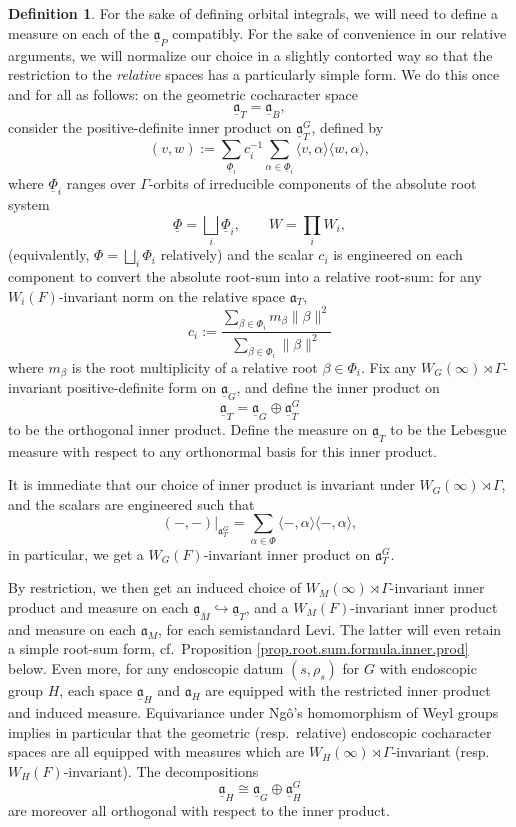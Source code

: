 \documentclass[openany]{amsbook}
\theoremstyle{definition}
\newtheorem{definition}[theorem]{Definition}
\theoremstyle{remark}
\numberwithin{equation}{section}
\newcommand{\ul}[1]{\underline{#1}}
\renewcommand{\-}{\operatorname{-}}
\renewcommand{\a}{\mathfrak{a}}
\newcommand{\ga}{\ul{\a}}
\begin{document}
\begin{definition}\label{def.cochar.space.measure.choice}
    For the sake of defining orbital integrals, we will need to define a measure on each of the $\ga_P$ compatibly. For the sake of convenience in our relative arguments, we will normalize our choice in a slightly contorted way so that the restriction to the \emph{relative} spaces has a particularly simple form. We do this once and for all as follows: on the geometric cocharacter space
    $$\ga_T = \ga_B,$$
    consider the positive-definite inner product on $\ga_T^G$, defined by
    $$
        (v, w) := \sum_{\ul{\Phi}_i} c_{i}^{-1} \sum_{\alpha \in \ul{\Phi}_i} \langle v, \alpha \rangle \langle w, \alpha \rangle,
    $$
    where $\ul{\Phi}_i$ ranges over $\Gamma$-orbits of irreducible components of the absolute root system
    $$
        \ul{\Phi} = \bigsqcup_i \ul{\Phi}_i, \qquad W = \prod_i W_i,
    $$
    (equivalently, $\Phi = \bigsqcup_i \Phi_i$ relatively) and the scalar $c_i$ is engineered on each component to convert the absolute root-sum into a relative root-sum: for any $W_i(F)$-invariant norm on the relative space $\a_T$,
    $$
        c_i := \frac{\sum_{\beta \in \Phi_i} m_\beta\| \beta\|^2}{\sum_{\beta \in \Phi_i}\| \beta\|^2}
    $$
    where $m_\beta$ is the root multiplicity of a relative root $\beta \in \Phi_i$. Fix any $W_G(\infty) \rtimes \Gamma$-invariant positive-definite form on $\ga_G$, and define the inner product on 
    $$
        \ga_T = \ga_G \oplus \ga_T^G
    $$
    to be the orthogonal inner product. Define the measure on $\ga_T$ to be the Lebesgue measure with respect to any orthonormal basis for this inner product. 
    
    It is immediate that our choice of inner product is invariant under $W_G(\infty) \rtimes \Gamma$, and the scalars are engineered such that
    $$
        (-,-)|_{\a_T^G} = \sum_{\alpha \in \Phi} \langle -, \alpha \rangle \langle -, \alpha \rangle,
    $$
    in particular, we get a $W_G(F)$-invariant inner product on $\a_T^G$. 
    
    By restriction, we then get an induced choice of $W_M(\infty) \rtimes \Gamma$-invariant inner product and measure on each $\ga_M \hookrightarrow \ga_T$, and a $W_M(F)$-invariant inner product and measure on each $\a_M$, for each semistandard Levi. The latter will even retain a simple root-sum form, cf.\ Proposition \ref{prop.root.sum.formula.inner.prod} below. Even more, for any endoscopic datum $(s, \rho_s)$ for $G$ with endoscopic group $H$, each space $\ga_H$ and $\a_H$ are equipped with the restricted inner product and induced measure. Equivariance under Ng\^{o}'s homomorphism of Weyl groups implies in particular that the geometric (resp.\ relative) endoscopic cocharacter spaces are all equipped with measures which are $W_H(\infty) \rtimes \Gamma$-invariant (resp.\ $W_H(F)$-invariant). The decompositions
    $$
        \ga_H \cong \ga_G \oplus \ga_H^G
    $$
    are moreover all orthogonal with respect to the inner product.
\end{definition}
\end{document}

